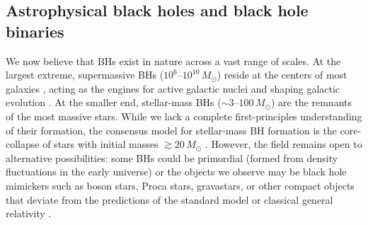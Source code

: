 \begin{refsection}
\section{Astrophysical black holes and black hole binaries}

We now believe that \acp{BH} exist in nature across a vast range of scales. At the largest extreme, supermassive \acp{BH} ($10^6$--$10^{10}\,M_{\odot}$) reside at the centers of most galaxies \citep{schodel_star_2002, ferrarese_fundamental_2000, gebhardt_relationship_2000, magorrian_demography_1998}, acting as the engines for active galactic nuclei and shaping galactic evolution \citep{antonucci_unified_1993, harrison_impact_2017}. At the smaller end, stellar-mass \acp{BH} ($\sim3$--$100\,M_{\odot}$) are the remnants of the most massive stars. While we lack a complete first-principles understanding of their formation, the consensus model for stellar-mass \ac{BH} formation is the core-collapse of stars with initial masses $\gtrsim 20\,M_{\odot}$ \citep[e.g.,][]{heger_how_2003, Woosley:2014lua}. However, the field remains open to alternative possibilities: some \acp{BH} could be primordial (formed from density fluctuations in the early universe) \citep{hawking_gravitationally_1971, carr_black_1974} or the objects we observe may be black hole mimickers such as boson stars, Proca stars, gravastars, or other compact objects that deviate from the predictions of the standard model or classical general relativity \citep{cardoso_testing_2019}.


\end{refsection}
